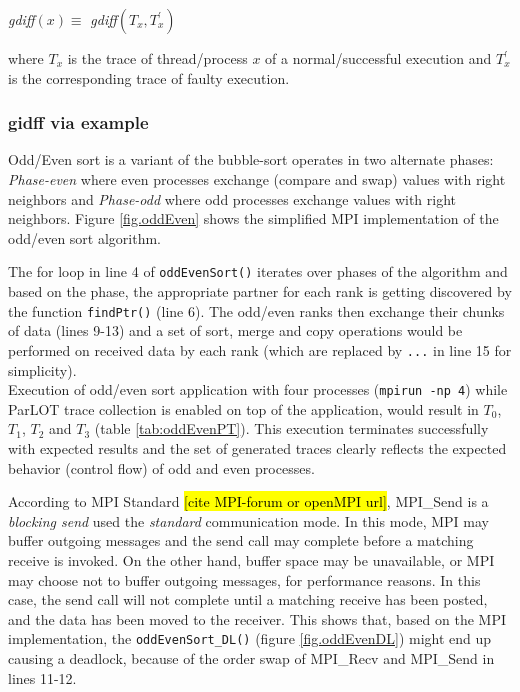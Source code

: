 \textit{gdiff}$(x) \equiv $ \textit{gdiff}$(T_x,T_x^\prime)$

where $T_x$ is the trace of thread/process $x$ of a normal/successful execution and $T^\prime_x$ is the corresponding trace of faulty execution.


\subsubsection{gidff via example}
Odd/Even sort is a variant of the bubble-sort operates in two alternate phases: \textit{Phase-even} where even processes exchange (compare and swap) values with right neighbors and \textit{Phase-odd} where odd processes exchange values with right neighbors. Figure \ref{fig.oddEven} shows the simplified MPI implementation of the odd/even sort algorithm.



The for loop in line 4 of \texttt{oddEvenSort()} iterates over phases of the algorithm and based on the phase, the appropriate partner for each rank is getting discovered by the function \texttt{findPtr()} (line 6). The odd/even ranks then exchange their chunks of data (lines 9-13) and a set of sort, merge and copy operations would be performed on received data by each rank (which are replaced by \texttt{...} in line 15 for simplicity).
\\

Execution of odd/even sort application with four processes (\texttt{mpirun -np 4}) while ParLOT trace collection is enabled on top of the application, would result in $T_0$, $T_1$, $T_2$ and $T_3$ (table \ref{tab:oddEvenPT}). This execution terminates successfully with expected results and the set of generated traces clearly reflects the expected behavior (control flow) of odd and even processes.
%



According to MPI Standard  \hl{[cite MPI-forum or openMPI url]}, MPI\_Send is a \textit{blocking send} used the \textit{standard} communication mode. In this mode,  MPI may buffer outgoing messages and the send call may complete before a matching receive is invoked. On the other hand, buffer space may be unavailable, or MPI may choose not to buffer outgoing messages, for performance reasons. In this case, the send call will not complete until a matching receive has been posted, and the data has been moved to the receiver. This shows that, based on the MPI implementation, the \texttt{oddEvenSort\_DL()} (figure \ref{fig.oddEvenDL}) might end up causing a deadlock, because of the order swap of MPI\_Recv and MPI\_Send in lines 11-12. 
%




